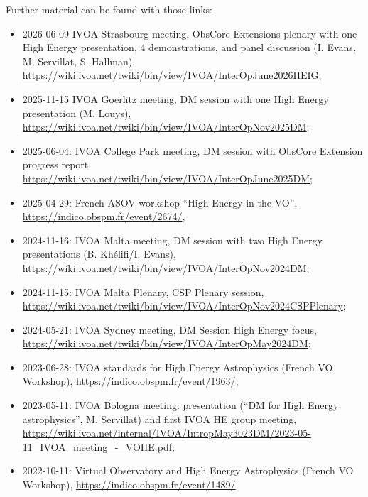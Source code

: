 \documentclass[11pt,a4paper]{ivoa}
\begin{document}
Further material can be found with those links:
\begin{itemize}
    \item 2026-06-09 IVOA Strasbourg meeting, ObsCore Extensions plenary with one High Energy presentation, 4 demonstrations, and panel discussion (I. Evans, M. Servillat, S. Hallman), \url{https://wiki.ivoa.net/twiki/bin/view/IVOA/InterOpJune2026HEIG};
    \item 2025-11-15 IVOA Goerlitz meeting, DM session with one High Energy presentation (M. Louys), \url{https://wiki.ivoa.net/twiki/bin/view/IVOA/InterOpNov2025DM};
    \item 2025-06-04: IVOA College Park meeting, DM session with ObsCore Extension progress report, \url{https://wiki.ivoa.net/twiki/bin/view/IVOA/InterOpJune2025DM};
    \item 2025-04-29: French ASOV workshop ``High Energy in the VO'', \url{https://indico.obspm.fr/event/2674/},
    \item 2024-11-16: IVOA Malta meeting, DM session with two High Energy presentations (B. Kh\'elifi/I. Evans), \url{https://wiki.ivoa.net/twiki/bin/view/IVOA/InterOpNov2024DM};
    \item 2024-11-15: IVOA Malta Plenary, CSP Plenary session, \url{https://wiki.ivoa.net/twiki/bin/view/IVOA/InterOpNov2024CSPPlenary};
    \item 2024-05-21: IVOA Sydney meeting, DM Session High Energy focus, \url{https://wiki.ivoa.net/twiki/bin/view/IVOA/InterOpMay2024DM};
    \item 2023-06-28: IVOA standards for High Energy Astrophysics (French VO Workshop), \url{https://indico.obspm.fr/event/1963/};
    \item 2023-05-11: IVOA Bologna meeting: presentation (``DM for High Energy astrophysics'', M. Servillat) and first IVOA HE group meeting, \url{https://wiki.ivoa.net/internal/IVOA/IntropMay3023DM/2023-05-11_IVOA_meeting_-_VOHE.pdf};
    \item 2022-10-11: Virtual Observatory and High Energy Astrophysics (French VO Workshop), \url{https://indico.obspm.fr/event/1489/}.
\end{itemize}

\end{document}
